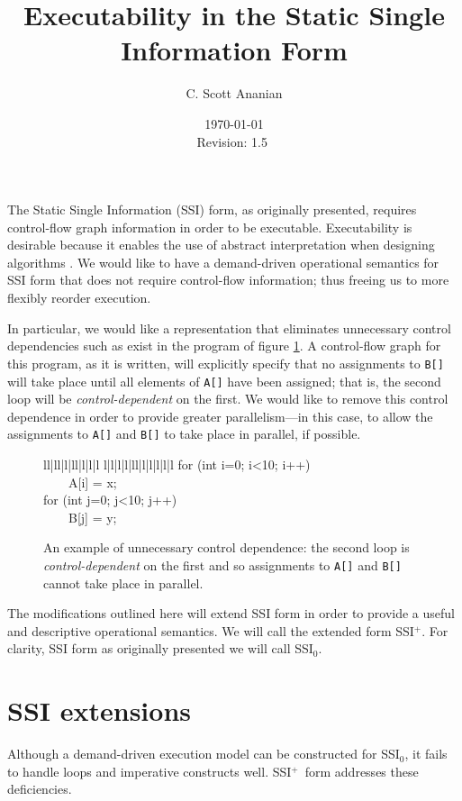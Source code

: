 \documentclass[12pt,notitlepage,twoside]{article}
\title{Executability in the Static Single Information Form}
\author{C. Scott Ananian}
\date{\today \\ $ $Revision: 1.5 $ $}
\newenvironment{samplecode}[1][1]
  {\setlength{\tabcolsep}{2\tabcolsep}%
\renewcommand{\>}{~~~~}%
\newcommand{\comment}[1]{\rm\it // ##1}%
\newcommand{\com}[1]{\comment{##1}}%
\newcommand{\ells}[1]{\ifcase#1\or l\or l|l\or l|l|l\or l|l|l|l\or
l|l|l|l|l\or l|l|l|l|l|l\fi}%
\begin{center}\tt\begin{tabular}{\ells{#1}}}
  {\end{tabular}\end{center}}
\newcommand{\ssizero}{SSI$_0$}
\newcommand{\ssiplus}{SSI$^+$}
\begin{document}


\maketitle

The Static Single Information (SSI) form, as originally presented,
requires control-flow graph information in order to be executable.
Executability is desirable because it enables the use of abstract
interpretation when designing algorithms \cite{pingali90:dfg}.  We
would like to have a demand-driven operational semantics for SSI form
that does not require control-flow information; thus freeing us to
more flexibly reorder execution.

In particular, we would like a representation that eliminates
unnecessary control dependencies such as exist in the program of
figure \ref{fig:ctrldep}.  A control-flow graph for this program, as
it is written, will explicitly specify that no assignments to
\texttt{B[]} will take place until all elements of \texttt{A[]} have
been assigned; that is, the second loop will be
\emph{control-dependent} on the first.  We would like to remove this
control dependence in order to provide greater parallelism---in this
case, to allow the assignments to \texttt{A[]} and \texttt{B[]} to
take place in parallel, if possible.

\begin{figure}[t]
\begin{samplecode}
for (int i=0; i<10; i++)\\
\>A[i] = x;\\
for (int j=0; j<10; j++)\\
\>B[j] = y;\\
\end{samplecode}
\caption{An example of unnecessary control dependence: the second loop
is \emph{control-dependent} on the first and so assignments to
\texttt{A[]} and \texttt{B[]} cannot take place in parallel.}
\label{fig:ctrldep}
\end{figure}

The modifications outlined here will extend SSI form in order to
provide a useful and descriptive operational semantics.  We will call
the extended form \ssiplus.  For clarity, SSI form as originally
presented we will call \ssizero.

\section{SSI extensions}
Although a demand-driven execution model can be constructed for
\ssizero,  it fails to handle loops and imperative
constructs well. \ssiplus\ form addresses these deficiencies.
\end{document}
